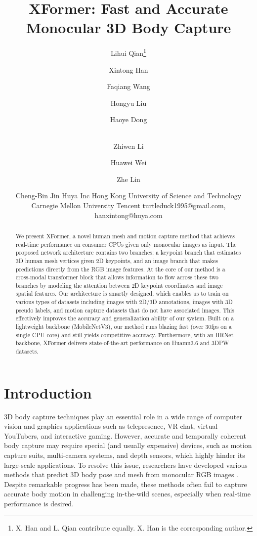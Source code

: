 \documentclass{article}
\title{XFormer: Fast and Accurate Monocular 3D Body Capture}
\author{
Lihui Qian\thanks{X. Han and L. Qian contribute equally. X. Han is the corresponding author.}
\and
Xintong Han
\and
Faqiang Wang
\and
Hongyu Liu
\and
Haoye Dong
\and \\
Zhiwen Li
\and
Huawei Wei
\and
Zhe Lin
\and
Cheng-Bin Jin
\affiliations
Huya Inc   \quad  Hong Kong University of Science and Technology\\
Carnegie Mellon University  \quad Tencent
\emails
turtleduck1995@gmail.com, hanxintong@huya.com
}
\begin{document}
\maketitle

\begin{abstract}
We present XFormer, a novel human mesh and motion capture method that achieves real-time performance on consumer CPUs given only monocular images as input. The proposed network architecture contains two branches: a keypoint branch that estimates 3D human mesh vertices given 2D keypoints, and an image branch that makes predictions directly from the RGB image features. At the core of our method is a cross-modal transformer block that allows information to flow across these two branches by modeling the attention between 2D keypoint coordinates and image spatial features. Our architecture is smartly designed, which enables us to train on various types of datasets including images with 2D/3D annotations, images with 3D pseudo labels, and motion capture datasets that do not have associated images. This effectively improves the accuracy and generalization ability of our system. Built on a lightweight backbone (MobileNetV3), our method runs blazing fast (over 30fps on a single CPU core) and still yields competitive accuracy. Furthermore, with an HRNet backbone, XFormer delivers state-of-the-art performance on Huamn3.6 and 3DPW datasets.
\end{abstract}

\section{Introduction}
\label{sec:intro}

3D body capture techniques play an essential role in a wide range of computer vision and graphics applications such as telepresence, VR chat, virtual YouTubers, and interactive gaming. However, accurate and temporally coherent body capture may require special (and usually expensive) devices, such as motion capture suits, multi-camera systems, and depth sensors, which highly hinder its large-scale applications. To resolve this issue, researchers have developed various methods that predict 3D body pose and mesh from monocular RGB images \cite{VNect_SIGGRAPH2017,kanazawa2018endtoend,kocabas2019vibe,mehta2020xnect,sun2021monocular,lin2020end,kocabas2021pare}. Despite remarkable progress has been made, these methods often fail to capture accurate body motion in challenging in-the-wild scenes, especially when real-time performance is desired.
\end{document}
